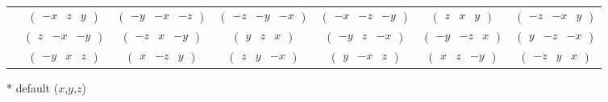 \documentclass[fleqn,9pt,landscape]{jsarticle}
\begin{document}
\begin{center}
\begin{longtable}{ccccccc}
& $ \begin{pmatrix} - x & z & y \end{pmatrix} $ & $ \begin{pmatrix} - y & - x & - z \end{pmatrix} $ & $ \begin{pmatrix} - z & - y & - x \end{pmatrix} $ & $ \begin{pmatrix} - x & - z & - y \end{pmatrix} $ & $ \begin{pmatrix} z & x & y \end{pmatrix} $ & $ \begin{pmatrix} - z & - x & y \end{pmatrix} $ \\
& $ \begin{pmatrix} z & - x & - y \end{pmatrix} $ & $ \begin{pmatrix} - z & x & - y \end{pmatrix} $ & $ \begin{pmatrix} y & z & x \end{pmatrix} $ & $ \begin{pmatrix} - y & z & - x \end{pmatrix} $ & $ \begin{pmatrix} - y & - z & x \end{pmatrix} $ & $ \begin{pmatrix} y & - z & - x \end{pmatrix} $ \\
& $ \begin{pmatrix} - y & x & z \end{pmatrix} $ & $ \begin{pmatrix} x & - z & y \end{pmatrix} $ & $ \begin{pmatrix} z & y & - x \end{pmatrix} $ & $ \begin{pmatrix} y & - x & z \end{pmatrix} $ & $ \begin{pmatrix} x & z & - y \end{pmatrix} $ & $ \begin{pmatrix} - z & y & x \end{pmatrix} $ \\
\end{longtable}
\end{center}
* default ($x$,$y$,$z$)
\end{document}

